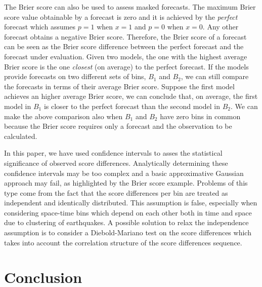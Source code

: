 \documentclass[referee,sn-basic]{sn-jnl}
\theoremstyle{thmstyleone}%
\theoremstyle{thmstyletwo}%
\theoremstyle{thmstylethree}%
\begin{document}
The Brier score can also be used to assess masked forecasts. The maximum Brier score value obtainable by a forecast is zero and it is achieved by the \emph{perfect} forecast which assumes $p = 1$ when $x = 1$ and $p = 0$ when $x = 0$. Any other forecast obtains a negative Brier score. Therefore, the Brier score of a forecast can be seen as the Brier score difference between the perfect forecast and the forecast under evaluation. Given two models, the one with the highest average Brier score is the one \emph{closest} (on average) to the perfect forecast. If the models provide forecasts on two different sets of bins, $B_1$ and $B_2$, we can still compare the forecasts in terms of their average Brier score. Suppose the first model achieves an higher average Brier score, we can conclude that, on average, the first model in $B_1$ is closer to the perfect forecast than the second model in $B_2$. We can make the above comparison also when $B_1$ and $B_2$ have zero bins in common because the Brier score requires only a forecast and the observation to be calculated. 

In this paper, we have used confidence intervals to asses the statistical significance of observed score differences. Analytically determining these confidence intervals may be too complex and a basic approximative Gaussian approach may fail, as highlighted by the Brier score example. Problems of this type come from the fact that the score differences per bin are treated as independent and identically distributed. This assumption is false, especially when considering space-time bins which depend on each other both in time and space due to clustering of earthquakes. A possible solution to relax the independence assumption is to consider a Diebold-Mariano test \citep{diebold2002comparing} on the score differences which takes into account the correlation structure of the score differences sequence.

\section{ Conclusion }
\end{document}
